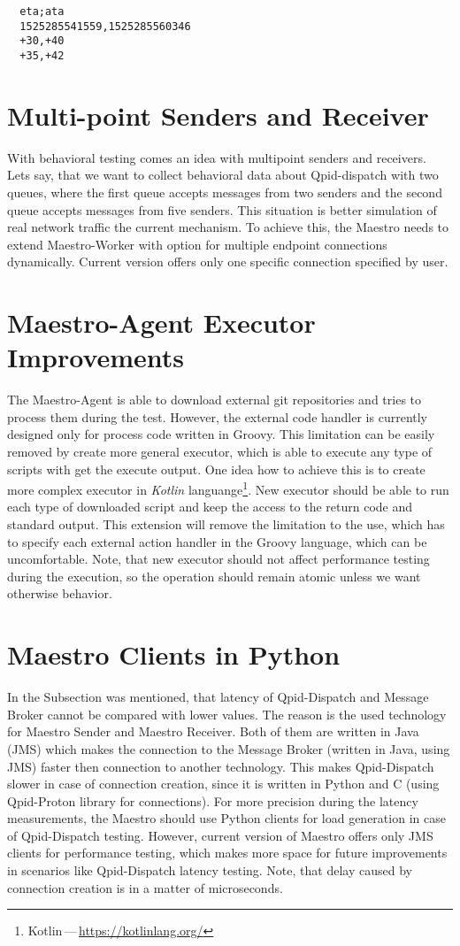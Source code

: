 \begin{verbatim}
  eta;ata
  1525285541559,1525285560346
  +30,+40
  +35,+42
\end{verbatim}

\section{Multi-point Senders and Receiver}
With behavioral testing comes an idea with multipoint senders and receivers. Lets say, that we want to collect behavioral data about Qpid-dispatch with two queues, where the first queue accepts messages from two senders and the second queue accepts messages from five senders. This situation is better simulation of real network traffic the current mechanism. To achieve this, the Maestro needs to extend Maestro-Worker with option for multiple endpoint connections dynamically. Current version offers only one specific connection specified by user.

\section{Maestro-Agent Executor Improvements}
The Maestro-Agent is able to download external git repositories and tries to process them during the test. However, the external code handler is currently designed only for process code written in Groovy. This limitation can be easily removed by create more general executor, which is able to execute any type of scripts with get the execute output. One idea how to achieve this is to create more complex executor in \emph{Kotlin} languange\footnote{Kotlin\,---\,\url{https://kotlinlang.org/}}. New executor should be able to run each type of downloaded script and keep the access to the return code and standard output. This extension will remove the limitation to the use, which has to specify each external action handler in the Groovy language, which can be uncomfortable. Note, that new executor should not affect performance testing during the execution, so the operation should remain atomic unless we want otherwise behavior.

\section{Maestro Clients in Python}
\label{Maestro Clients in Python}
In the Subsection \label{Latency} was mentioned, that latency of Qpid-Dispatch and Message Broker cannot be compared with lower values. The reason is the used technology for Maestro Sender and Maestro Receiver. Both of them are written in Java (JMS) which makes the connection to the Message Broker (written in Java, using JMS) faster then connection to another technology. This makes Qpid-Dispatch slower in case of connection creation, since it is written in Python and C (using Qpid-Proton library for connections). For more precision during the latency measurements, the Maestro should use Python clients for load generation in case of Qpid-Dispatch testing. However, current version of Maestro offers only JMS clients for performance testing, which makes more space for future improvements in scenarios like Qpid-Dispatch latency testing. Note, that delay caused by connection creation is in a matter of microseconds.
